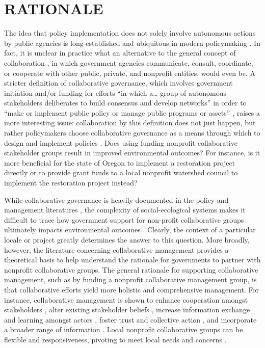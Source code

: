 \documentclass[12pt,a4paper,titlepage]{article}
\begin{document}
\section*{\bf\MakeUppercase{Rationale}}

The idea that policy implementation does not solely involve autonomous actions by public agencies is long-established \parencite[e.g.,][]{ostrom1961} and ubiquitous in modern policymaking \parencite[][p. 8]{salamon2002}. In fact, it is unclear in practice what an alternative to the general concept of collaboration \parencite{donahue2011,agranoff2003}, in which government agencies communicate, consult, coordinate, or cooperate with other public, private, and nonprofit entities, would even be. A stricter definition of collaborative governance, which involves government initiation and/or funding \parencite{ansell2008} for efforts “in which a… group of autonomous stakeholders deliberates to build consensus and develop networks” \parencite[p. 6]{margerum2011} in order to “make or implement public policy or manage public programs or assets” \parencite[p. 544]{ansell2008}, raises a more interesting issue: collaboration by this definition does not just happen, but rather policymakers choose collaborative governance as a means through which to design and implement policies \parencite{layzer2008, hoornbeek2012, koontz2004}. Does using funding nonprofit collaborative stakeholder groups result in improved environmental outcomes? For instance, is it more beneficial for the state of Oregon to implement a restoration project directly or to provide grant funds to a local nonprofit watershed council to implement the restoration project instead?

While collaborative governance is heavily documented in the policy and management literatures \parencite{emerson2012,margerum2011,sabatier2005,ansell2008,lubell2004}, the complexity of social-ecological systems makes it difficult to trace how government support for non-profit collaborative groups ultimately impacts environmental outcomes \parencite{koontz2006, thomas2011}. Clearly, the context of a particular locale or project greatly determines the answer to this question. More broadly, however, the literature concerning collaborative management provides a theoretical basis to help understand the rationale for governments to partner with nonprofit collaborative groups. The general rationale for supporting collaborative management, such as by funding a nonprofit collaborative management group, is that collaborative efforts yield more holistic and comprehensive management. For instance, collaborative management is shown to enhance cooperation amongst stakeholders \parencite{lubell2004}, alter existing stakeholder beliefs \parencite{leach2013}, increase information exchange and learning amongst actors \parencite{beierle2002,weible2009}, foster trust and collective action \parencite{lubell2005}, and incorporate a broader range of information \parencite{innes1999,wondolleck2000}. Local nonprofit collaborative groups can be flexible and responsiveness, pivoting to meet local needs and concerns \parencite{nikolic2008}.
\end{document}
